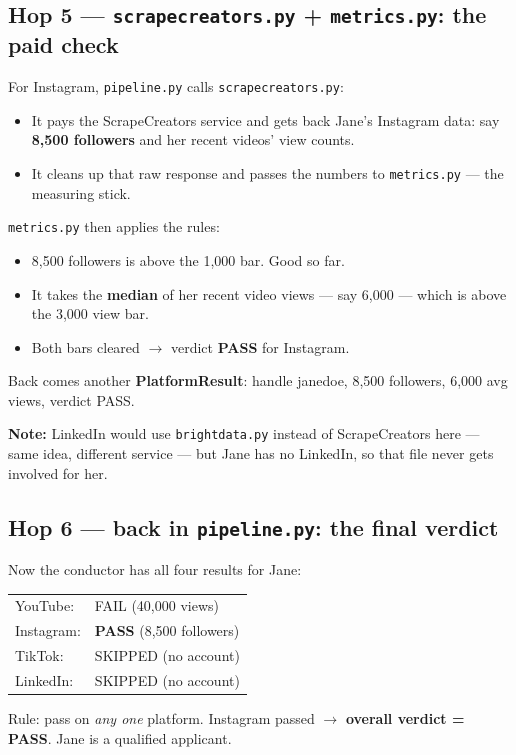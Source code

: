 \documentclass[11pt]{article}
\newcommand{\term}[1]{\textbf{\color{brandpurple}#1}}
\newcommand{\file}[1]{\texttt{\color{inkdark}#1}}
\begin{document}
\subsection{Hop 5 — \file{scrapecreators.py} + \file{metrics.py}: the paid check}

For Instagram, \file{pipeline.py} calls \file{scrapecreators.py}:
\begin{itemize}
  \item It pays the ScrapeCreators service and gets back Jane's Instagram data:
  say \textbf{8,500 followers} and her recent videos' view counts.
  \item It cleans up that raw response and passes the numbers to
  \file{metrics.py} — the measuring stick.
\end{itemize}

\file{metrics.py} then applies the rules:
\begin{itemize}
  \item 8,500 followers is above the 1,000 bar. Good so far.
  \item It takes the \textbf{median} of her recent video views — say 6,000 —
  which is above the 3,000 view bar.
  \item Both bars cleared $\rightarrow$ verdict \term{PASS} for Instagram.
\end{itemize}
Back comes another \term{PlatformResult}: handle janedoe, 8,500 followers,
6,000 avg views, verdict PASS.

\begin{analogybox}
\textbf{Note:} LinkedIn would use \file{brightdata.py} instead of
ScrapeCreators here — same idea, different service — but Jane has no LinkedIn,
so that file never gets involved for her.
\end{analogybox}

\subsection{Hop 6 — back in \file{pipeline.py}: the final verdict}

Now the conductor has all four results for Jane:
\begin{plainbox}
\begin{tabular}{ll}
YouTube: & FAIL (40,000 views) \\
Instagram: & \textbf{PASS} (8,500 followers) \\
TikTok: & SKIPPED (no account) \\
LinkedIn: & SKIPPED (no account) \\
\end{tabular}
\end{plainbox}
Rule: pass on \emph{any one} platform. Instagram passed $\rightarrow$
\textbf{overall verdict = PASS}. Jane is a qualified applicant.
\end{document}
